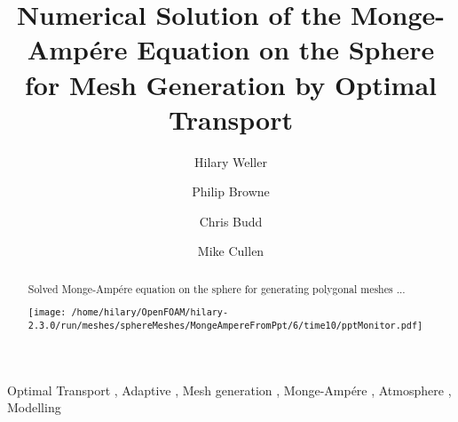 \begin{frontmatter}

\title{Numerical Solution of the Monge-Amp\'ere Equation on the Sphere for Mesh Generation by Optimal Transport}

\author[label1]{Hilary Weller}
\author[label1]{Philip Browne}
\author[label2]{Chris Budd}
\author[label3]{Mike Cullen}
\address[label1]{Meteorology, University of Reading, UK}
\address[label2]{University of Bath, UK}
\address[label3]{Met Office, UK}

\begin{abstract}

Solved Monge-Amp\'ere equation on the sphere for generating polygonal meshes ... 


\texttt{[image: /home/hilary/OpenFOAM/hilary-2.3.0/run/meshes/sphereMeshes/MongeAmpereFromPpt/6/time10/pptMonitor.pdf]}

\end{abstract}

\begin{keyword}
Optimal Transport \sep
Adaptive \sep
Mesh generation \sep
Monge-Amp\'ere \sep
Atmosphere \sep
Modelling
\end{keyword}

\end{frontmatter}

